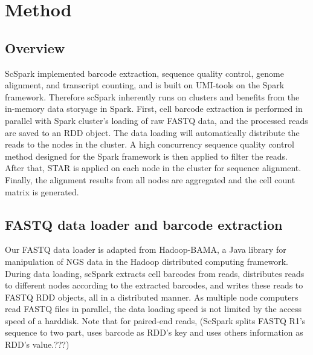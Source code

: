 \documentclass[conference]{IEEEtran}
\begin{document}
\fi


\section{Method}
\subsection{Overview}

ScSpark implemented barcode extraction, sequence quality control, genome alignment, and transcript counting, and is built on UMI-tools on the Spark framework. 
Therefore scSpark inherently runs on clusters and benefits from the in-memory data storyage in Spark. 
First, cell barcode extraction is performed in parallel with Spark cluster's loading of raw FASTQ data, and the processed reads are saved to an RDD object. 
The data loading will automatically distribute the reads to the nodes in the cluster. %
A high concurrency sequence quality control method designed for the Spark framework is then applied to filter the reads. 
After that, STAR is applied on each node in the cluster for sequence alignment. 
Finally, the alignment results from all nodes are aggregated and the cell count matrix is generated. 

\subsection{FASTQ data loader and barcode extraction}

Our FASTQ data loader is adapted from Hadoop-BAMA\cite{hadoopBAM}, a Java library for manipulation of NGS data in the Hadoop distributed computing framework. 
During data loading, scSpark extracts cell barcodes from reads, distributes reads to different nodes according to the extracted barcodes, and writes these reads to FASTQ RDD objects, all in a distributed manner. 
As multiple node computers read FASTQ files in parallel, the data loading speed is not limited by the access speed of a harddisk. 
Note that for paired-end reads, (ScSpark splits FASTQ R1's sequence to two part, uses barcode as RDD's key and uses others information as RDD's value.???)
\end{document}
